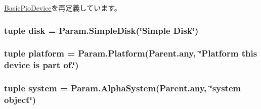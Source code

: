\hyperlink{classDevice_1_1BasicPioDevice_a17da7064bc5c518791f0c891eff05fda}{BasicPioDevice}を再定義しています。\hypertarget{classAlphaBackdoor_1_1AlphaBackdoor_a2cb8a7cfa320c243ad28a4ba142879c4}{
\subsubsection[{disk}]{\setlength{\rightskip}{0pt plus 5cm}tuple {\bf disk} = Param.SimpleDisk(\char`\"{}Simple Disk\char`\"{})}}
\label{classAlphaBackdoor_1_1AlphaBackdoor_a2cb8a7cfa320c243ad28a4ba142879c4}
\hypertarget{classAlphaBackdoor_1_1AlphaBackdoor_ae6d09ca44893db6cdb66d62deaa1aefd}{
\subsubsection[{platform}]{\setlength{\rightskip}{0pt plus 5cm}tuple platform = Param.Platform(Parent.any, \char`\"{}Platform this device is part of.\char`\"{})}}
\label{classAlphaBackdoor_1_1AlphaBackdoor_ae6d09ca44893db6cdb66d62deaa1aefd}
\hypertarget{classAlphaBackdoor_1_1AlphaBackdoor_ab737471139f5a296e5b26e8a0e1b0744}{
\subsubsection[{system}]{\setlength{\rightskip}{0pt plus 5cm}tuple {\bf system} = Param.AlphaSystem(Parent.any, \char`\"{}system object\char`\"{})}}
\label{classAlphaBackdoor_1_1AlphaBackdoor_ab737471139f5a296e5b26e8a0e1b0744}


